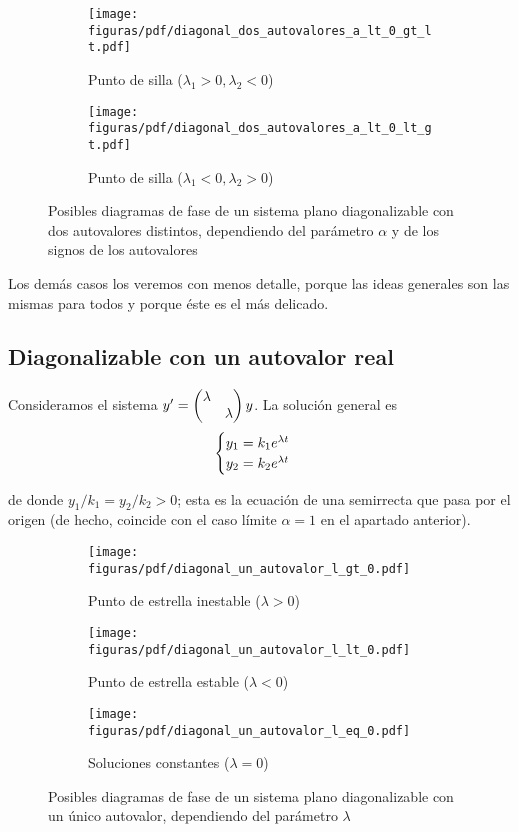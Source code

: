 \documentclass[../ecuaciones_diferenciales.tex]{subfiles}
\begin{document}
\begin{figure}[ht]
  \begin{subfigure}{0.25\textwidth}
    \centering
    \texttt{[image: figuras/pdf/diagonal\_dos\_autovalores\_a\_lt\_0\_gt\_lt.pdf]}
    \caption*{Punto de silla (\(\lambda_1 > 0, \lambda_2 < 0\))}
  \end{subfigure}%
  \begin{subfigure}{0.25\textwidth}
    \centering
    \texttt{[image: figuras/pdf/diagonal\_dos\_autovalores\_a\_lt\_0\_lt\_gt.pdf]}
    \caption*{Punto de silla (\(\lambda_1 < 0, \lambda_2 > 0\))}
  \end{subfigure}
  \caption{Posibles diagramas de fase de un sistema plano diagonalizable con dos
    autovalores distintos, dependiendo del parámetro \(\alpha\) y de los signos
    de los autovalores}
\end{figure}

Los demás casos los veremos con menos detalle, porque las ideas generales son
las mismas para todos y porque éste es el más delicado.

\subsection{Diagonalizable con un autovalor real}

Consideramos el sistema \(y' = \begin{pmatrix}\lambda & \\ & \lambda\end{pmatrix} y\). La solución
general es
\[\begin{cases}
	y_1 = k_1e^{\lambda t} \\
	y_2 = k_2e^{\lambda t}\end{cases}\]

de donde \(y_1/k_1 = y_2/k_2 > 0\); esta es la ecuación de una semirrecta que
pasa por el origen (de hecho, coincide con el caso límite \(\alpha = 1\) en el
apartado anterior).

\begin{figure}[ht]
	\centering
	\begin{subfigure}{0.33\textwidth}
		\centering
		\texttt{[image: figuras/pdf/diagonal\_un\_autovalor\_l\_gt\_0.pdf]}
		\caption*{Punto de estrella inestable (\(\lambda > 0\))}
	\end{subfigure}%
	\begin{subfigure}{0.33\textwidth}
		\centering
		\texttt{[image: figuras/pdf/diagonal\_un\_autovalor\_l\_lt\_0.pdf]}
		\caption*{Punto de estrella estable (\(\lambda < 0\))}
	\end{subfigure}%
	\begin{subfigure}{0.33\textwidth}
		\centering
		\texttt{[image: figuras/pdf/diagonal\_un\_autovalor\_l\_eq\_0.pdf]}
		\caption*{Soluciones constantes (\(\lambda = 0\))}
	\end{subfigure}
	\caption{Posibles diagramas de fase de un sistema plano diagonalizable con 
	un único autovalor, dependiendo del parámetro \(\lambda\)}
\end{figure}
\end{document}
